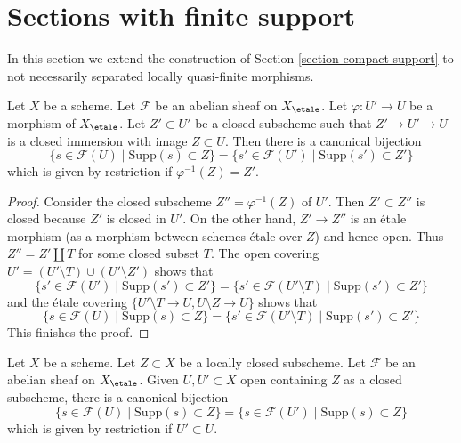 \section{Sections with finite support}
\label{section-finite-support}

\noindent
In this section we extend the construction of
Section \ref{section-compact-support} to not necessarily
separated locally quasi-finite morphisms.

\begin{lemma}
\label{lemma-section-support-in-locally-closed-pre}
Let $X$ be a scheme. Let $\mathcal{F}$ be an abelian sheaf on $X_\etale$.
Let $\varphi : U' \to U$ be a morphism of $X_\etale$. Let $Z' \subset U'$ be a
closed subscheme such that $Z' \to U' \to U$ is a closed immersion
with image $Z \subset U$. Then there is a canonical bijection
$$
\{s \in \mathcal{F}(U) \mid \text{Supp}(s) \subset Z\} =
\{s' \in \mathcal{F}(U') \mid \text{Supp}(s') \subset Z'\}
$$
which is given by restriction if $\varphi^{-1}(Z) = Z'$.
\end{lemma}

\begin{proof}
Consider the closed subscheme $Z'' = \varphi^{-1}(Z)$ of $U'$.
Then $Z' \subset Z''$ is closed because $Z'$ is closed in $U'$.
On the other hand, $Z' \to Z''$ is an \'etale morphism
(as a morphism between schemes \'etale over $Z$) and hence
open. Thus $Z'' = Z' \amalg T$ for some closed subset $T$.
The open covering $U' = (U' \setminus T) \cup (U' \setminus Z')$
shows that
$$
\{s' \in \mathcal{F}(U') \mid \text{Supp}(s') \subset Z'\} =
\{s' \in \mathcal{F}(U' \setminus T) \mid \text{Supp}(s') \subset Z'\}
$$
and the \'etale covering $\{U' \setminus T \to U, U \setminus Z \to U\}$
shows that
$$
\{s \in \mathcal{F}(U) \mid \text{Supp}(s) \subset Z\} =
\{s' \in \mathcal{F}(U' \setminus T) \mid \text{Supp}(s') \subset Z'\}
$$
This finishes the proof.
\end{proof}

\begin{lemma}
\label{lemma-section-support-in-locally-closed}
Let $X$ be a scheme. Let $Z \subset X$ be a locally closed subscheme.
Let $\mathcal{F}$ be an abelian sheaf on $X_\etale$. Given
$U, U' \subset X$ open containing $Z$ as a closed subscheme,
there is a canonical bijection
$$
\{s \in \mathcal{F}(U) \mid \text{Supp}(s) \subset Z\} =
\{s \in \mathcal{F}(U') \mid \text{Supp}(s) \subset Z\}
$$
which is given by restriction if $U' \subset U$.
\end{lemma}

